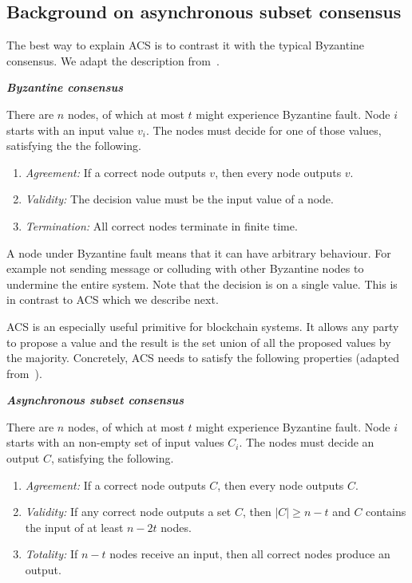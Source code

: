\subsection{Background on asynchronous subset consensus}
\label{sec:acs-background}

The best way to explain ACS is to contrast it with the typical Byzantine consensus.
We adapt the description from~\cite[Chapter 17]{podc}.
\begin{definition}
\textbf{\emph{Byzantine consensus}}

There are $n$ nodes, of which at most $t$ might experience Byzantine fault.
Node $i$ starts with an input value $v_i$.
The nodes must decide for one of  those values, satisfying the the following.
\begin{enumerate}
    \item \emph{Agreement:}
        If a correct node outputs $v$, then every node outputs $v$.
    \item \emph{Validity:}
        The decision value must be the input value of a node.
    \item \emph{Termination:}
        All correct nodes terminate in finite time.
\end{enumerate}
\end{definition}
A node under Byzantine fault means that it can have arbitrary behaviour.
For example not sending message or colluding with other Byzantine nodes to undermine the entire system.
Note that the decision is on a single value.
This is in contrast to ACS which we describe next.

ACS is an especially useful primitive for blockchain systems.
It allows any party to propose a value and the result is the set union of all the proposed values by the majority.
Concretely, ACS needs to satisfy the following properties (adapted from~\cite{miller2016honey}).
\begin{definition}
\label{def:acs}
\textbf{\emph{Asynchronous subset consensus}}

There are $n$ nodes, of which at most $t$ might experience Byzantine fault.
Node $i$ starts with an non-empty set of input values $C_i$.
The nodes must decide an output $C$, satisfying the following.
\begin{enumerate}
    \item \emph{Agreement:}
        If a correct node outputs $C$, then every node outputs $C$.
    \item \emph{Validity:}
        If any correct node outputs a set $C$,
        then $|C| \ge n - t$ and $C$ contains the input of at least $n - 2t$ nodes.
    \item \emph{Totality:}
        If $n - t$ nodes receive an input, then all correct nodes produce an output.
\end{enumerate}
\end{definition}

